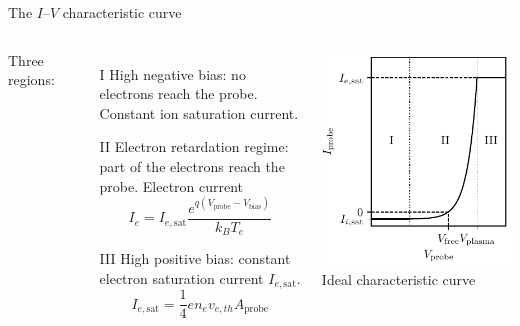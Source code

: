 \documentclass[10pt]{beamer}
\newcommand{\electronsaturationcurrent}[0]{\ensuremath{I_{e,{\mathrm{sat}}}}}
\newcommand{\biasvoltage}{\ensuremath{V_{\mathrm{bias}}}}
\newcommand{\probevoltage}{\ensuremath{V_{\mathrm{probe}}}}
\begin{document}
\begin{frame}{The $I$--$V$ characteristic curve}
    \begin{columns}
        Three regions:
        \begin{enumerate}
            \item[I] High negative bias: no electrons reach the probe. Constant ion saturation current.
            \item[II] Electron retardation regime: part of the electrons reach the probe. Electron current 
            \begin{equation*}
                I_e = \electronsaturationcurrent \frac{e^{q(\probevoltage - \biasvoltage)}}{k_B T_e}
            \end{equation*}
            \item[III] High positive bias: constant electron saturation current $\electronsaturationcurrent$.
            \begin{equation*}
                \electronsaturationcurrent = \frac{1}{4}e n_e v_{e,th} A_{\mathrm{probe}}
            \end{equation*}
        \end{enumerate}
        \centering
        \includegraphics[scale=1]{../figures/langmuir_characteristic.pdf}
        \small Ideal characteristic curve
    \end{columns}
\end{frame}
\end{document}
